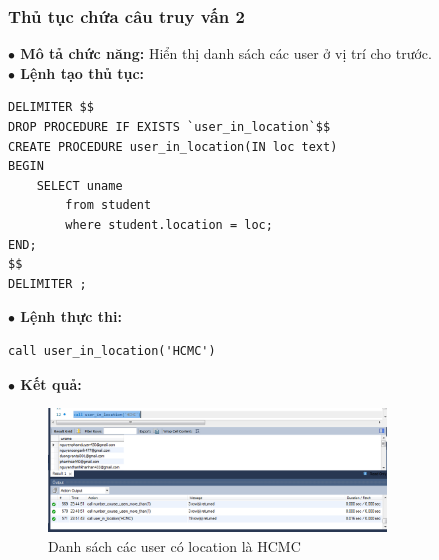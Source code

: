 \documentclass[12pt,a4paper,titlepage]{article}
\begin{document}
\subsubsection{Thủ tục chứa câu truy vấn 2}
\textbf{$\bullet$ Mô tả chức năng:} Hiển thị danh sách các user ở vị trí cho trước. \\
\textbf{$\bullet$ Lệnh tạo thủ tục:}
\begin{lstlisting}
DELIMITER $$
DROP PROCEDURE IF EXISTS `user_in_location`$$
CREATE PROCEDURE user_in_location(IN loc text)
BEGIN
    SELECT uname
		from student
		where student.location = loc;
END;
$$
DELIMITER ;

\end{lstlisting}
\textbf{$\bullet$ Lệnh thực thi:}
\begin{lstlisting}
call user_in_location('HCMC')
\end{lstlisting}
\textbf{$\bullet$ Kết quả:}
\begin{figure}[h!]
	\centering
	\caption{Danh sách các user có location là HCMC}
	\includegraphics[width=0.8\textwidth]{images/image8.png}
\end{figure}
\end{document}
